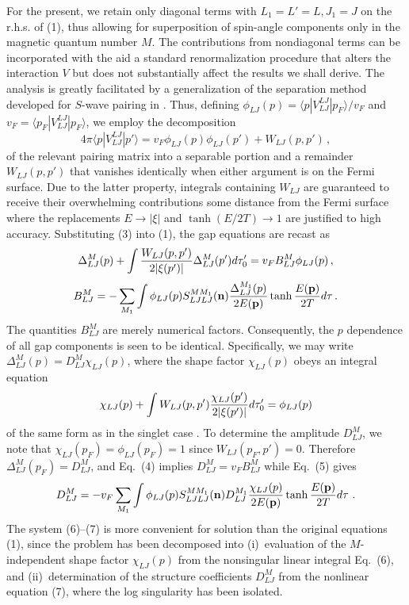 For the present, we retain only diagonal terms with $L_1= L'=L,J_1=J$ 
on the r.h.s. of (1), thus allowing for superposition of spin-angle
components only in the magnetic quantum number $M$.  The contributions 
from nondiagonal terms can be incorporated with the aid a standard 
renormalization procedure that alters the interaction $V$ but does 
not substantially affect the results we shall derive.  The analysis 
is greatly facilitated by a generalization of the separation method 
developed for $S$-wave pairing in \cite{kkc}.   Thus, defining 
$\phi_{LJ}(p)=\langle p|V_{LJ}^{LJ}|p_F\rangle /v_F$ and 
$v_F=\langle p_F|V_{LJ}^{LJ}|p_F\rangle $, we employ the decomposition
\begin{equation}
  4\pi\langle p| V_{LJ}^{LJ}| p'\rangle 
= v_F\phi_{LJ}(p)\phi_{LJ}(p')+W_{LJ}(p,p') \, ,
\end{equation}
of the relevant pairing matrix into a separable portion and a
remainder $W_{LJ}(p,p')$ that vanishes identically when either
argument is on the Fermi surface.   Due to the latter property, 
integrals containing $W_{LJ}$ are guaranteed to receive their overwhelming
contributions some distance from the Fermi surface where the 
replacements $E\rightarrow |\xi|$ and $\tanh (E/2T)\rightarrow 1$ 
are justified to high accuracy.  Substituting (3) into (1), 
the gap equations are recast as
\begin{equation}
  \Delta_{LJ}^M(p)+\int {W_{LJ}(p,p')\over 2|\xi(p')|}
  \Delta_{LJ}^M(p')d\tau_0'=v_FB_{LJ}^M\phi_{LJ}(p) \, ,
\end{equation}
\begin{equation}
  B^M_{LJ}
= -\sum_{M_1} \int \phi_{LJ}(p)S^{MM_1}_{LJLJ}({\bf n})
  {\Delta_{LJ}^{M_1}(p)\over 2E({\bf p})}
  \tanh {E({\bf p})\over 2T}d\tau \, .
\end{equation}
The quantities $B^M_{LJ}$ are merely numerical factors.  Consequently,
the $p$ dependence  of all gap components is seen to be identical.
Specifically, we may write $\Delta_{LJ}^M(p)=D_{LJ}^M\chi_{LJ}(p)$, 
where the shape factor $\chi_{LJ}(p)$ obeys an integral equation 
\begin{equation}
   \chi_{LJ}(p) + \int W_{LJ}(p,p')
   {\chi_{LJ}(p') \over 2|\xi(p')|}d\tau_0'=\phi_{LJ}(p) 
\end{equation}
of the same form as in the singlet case \cite{kkc}.  To determine
the amplitude $D_{LJ}^M$, we note that $\chi_{LJ}(p_F)=\phi_{LJ}(p_F)=1$  
since $W_{LJ}(p_F,p')=0$.  Therefore $\Delta_{LJ}^M(p_F)=D_{LJ}^M$,
and Eq.~(4) implies $D_{LJ}^M=v_FB^M_{LJ}$ while Eq.~(5) gives
\begin{equation}
   D^M_{LJ}
= -v_F\sum_{M_1} \int \phi_{LJ}(p)S^{MM_1}_{LJLJ}({\bf n})
  D^{M_1}_{LJ} {\chi_{LJ}(p)\over 2E({\bf p})} 
  \tanh {E({\bf p})\over 2T}d\tau \ .
\end{equation}
The system (6)--(7) is more convenient for solution than the 
original equations (1), since the problem has been decomposed into
(i)~evaluation of the $M$-independent shape factor 
$\chi_{LJ}(p)$ from the nonsingular linear integral Eq.~(6), and
(ii)~determination of the structure coefficients $D^M_{LJ}$ from the
nonlinear equation (7), where the log singularity has been isolated.

